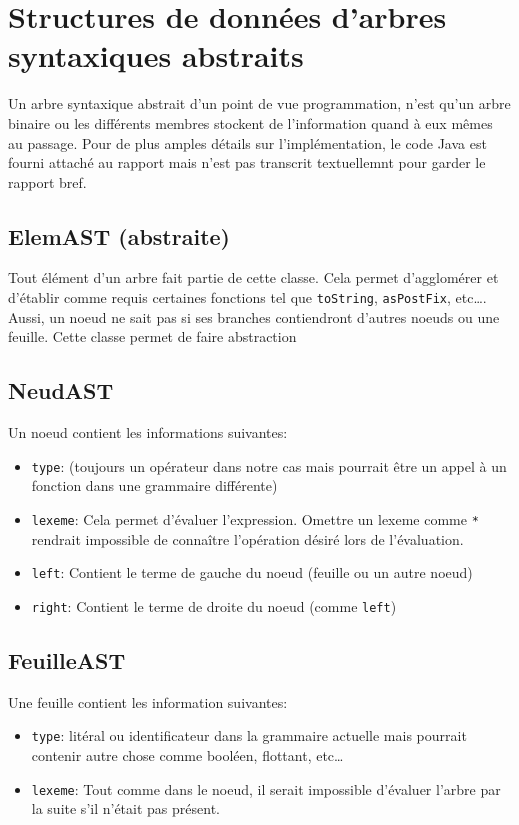 \section{Structures de données d’arbres syntaxiques abstraits}

Un arbre syntaxique abstrait d'un point de vue programmation, n'est qu'un
arbre binaire ou les différents membres stockent de l'information quand à eux
mêmes au passage. Pour de plus amples détails sur l'implémentation, le code Java
est fourni attaché au rapport mais n'est pas transcrit textuellemnt pour garder le
rapport bref.


\subsection{ElemAST (abstraite)}

Tout élément d'un arbre fait partie de cette classe. Cela permet d'agglomérer
et d'établir comme requis certaines fonctions tel que \verb|toString|,
\verb|asPostFix|, etc\ldots. Aussi, un noeud ne sait pas si ses branches
contiendront d'autres noeuds ou une feuille. Cette classe permet de faire abstraction


\subsection{NeudAST}

Un noeud contient les informations suivantes:

\begin{itemize}
  \item \verb|type|: (toujours un opérateur dans notre cas mais pourrait être un
        appel à un fonction dans une grammaire différente)
  \item \verb|lexeme|: Cela permet d'évaluer l'expression. Omettre un lexeme comme \verb|*|
        rendrait impossible de connaître l'opération désiré lors de l'évaluation.
  \item \verb|left|: Contient le terme de gauche du noeud (feuille ou un autre noeud)
  \item \verb|right|: Contient le terme de droite du noeud (comme \verb|left|)
\end{itemize}

\subsection{FeuilleAST}

Une feuille contient les information suivantes:
\begin{itemize}
  \item \verb|type|: litéral ou identificateur dans la grammaire actuelle
        mais pourrait contenir autre chose comme booléen, flottant, etc\ldots
  \item \verb|lexeme|: Tout comme dans le noeud, il serait impossible
        d'évaluer l'arbre par la suite s'il n'était pas présent.
\end{itemize}
